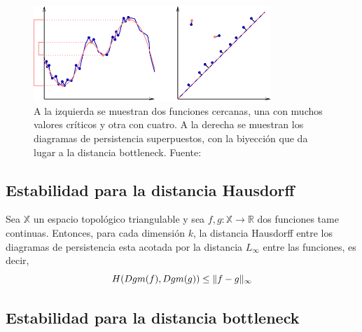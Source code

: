 \begin{figure}[!ht]
\centering
\includegraphics[width=0.8\textwidth]{include/figuras/estabilidadEj.png} 
\caption{A la izquierda se muestran dos funciones cercanas, una con muchos valores críticos y otra con cuatro. A la derecha se muestran los diagramas de persistencia superpuestos, con la biyección que da lugar a la distancia bottleneck. Fuente: \cite{Cohen-Steiner2007}}
\label{ref:ejEstabilidad}
\end{figure}  

\subsection{Estabilidad para la distancia Hausdorff}
\begin{theorem}
Sea $\mathbb{X}$ un espacio topológico triangulable y sea $f,g: \mathbb{X} \to \mathbb{R}$ dos funciones tame continuas. Entonces, para cada dimensión $k$, la distancia Hausdorff entre los diagramas de persistencia esta acotada por la distancia $L_\infty$ entre las funciones, es decir,
\[
H(Dgm(f), Dgm(g)) \leq \lVert f-g\rVert_\infty
\]
\end{theorem}
\subsection{Estabilidad para la distancia bottleneck}
